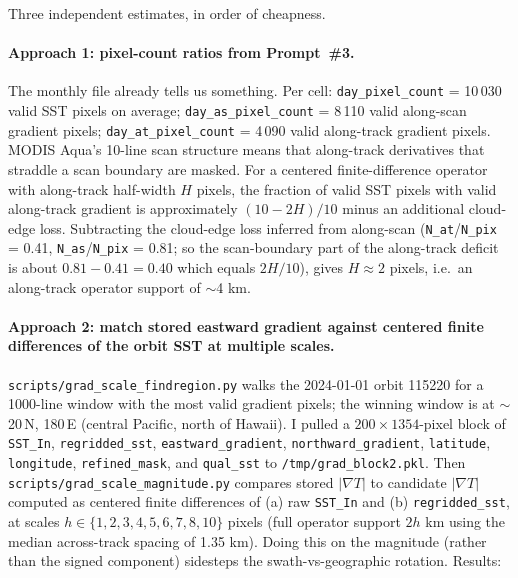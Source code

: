 \documentclass[11pt]{article}
\begin{document}
Three independent estimates, in order of cheapness.

\paragraph{Approach 1: pixel-count ratios from Prompt~\#3.}
The monthly file already tells us something. Per cell:
\texttt{day\_pixel\_count} = 10\,030 valid SST pixels on average;
\texttt{day\_as\_pixel\_count} = 8\,110 valid along-scan gradient
pixels; \texttt{day\_at\_pixel\_count} = 4\,090 valid along-track
gradient pixels. MODIS Aqua's 10-line scan structure means that
along-track derivatives that straddle a scan boundary are masked.
For a centered finite-difference operator with along-track
half-width $H$ pixels, the fraction of valid SST pixels with valid
along-track gradient is approximately
$(10-2H)/10$ minus an additional cloud-edge loss. Subtracting
the cloud-edge loss inferred from along-scan
(\texttt{N\_at}/\texttt{N\_pix} = 0.41,
\texttt{N\_as}/\texttt{N\_pix} = 0.81; so the scan-boundary part
of the along-track deficit is about
$0.81 - 0.41 = 0.40$ which equals $2H/10$), gives $H\approx 2$
pixels, i.e.\ an along-track operator support of $\sim$4 km.

\paragraph{Approach 2: match stored eastward gradient against
centered finite differences of the orbit SST at multiple scales.}
\texttt{scripts/grad\_scale\_findregion.py} walks the
2024-01-01 orbit 115220 for a 1000-line window with the most
valid gradient pixels; the winning window is at $\sim$20\,N,
180\,E (central Pacific, north of Hawaii). I pulled a
$200\times 1354$-pixel block of \texttt{SST\_In},
\texttt{regridded\_sst}, \texttt{eastward\_gradient},
\texttt{northward\_gradient}, \texttt{latitude},
\texttt{longitude}, \texttt{refined\_mask}, and \texttt{qual\_sst}
to \texttt{/tmp/grad\_block2.pkl}. Then
\texttt{scripts/grad\_scale\_magnitude.py} compares stored
$|\nabla T|$ to candidate $|\nabla T|$ computed as centered finite
differences of (a) raw \texttt{SST\_In} and (b)
\texttt{regridded\_sst}, at scales $h\in\{1,2,3,4,5,6,7,8,10\}$
pixels (full operator support $2h$ km using the median across-track
spacing of 1.35 km). Doing this on the magnitude (rather than the
signed component) sidesteps the swath-vs-geographic rotation.
Results:
\end{document}

